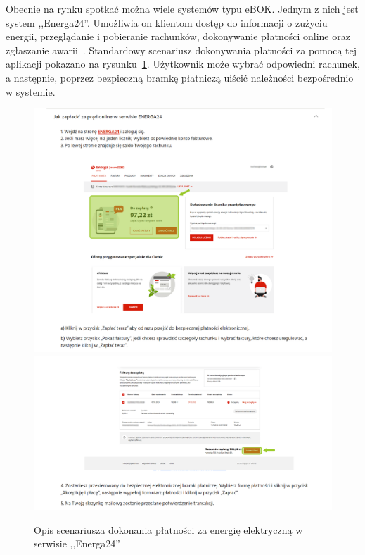 Obecnie na rynku spotkać można wiele systemów typu eBOK. Jednym z nich jest system ,,Energa24''. Umożliwia on klientom dostęp do informacji o zużyciu energii, przeglądanie i pobieranie rachunków, dokonywanie płatności online oraz zgłaszanie awarii~\cite{energa}. Standardowy scenariusz dokonywania płatności za pomocą tej aplikacji pokazano na rysunku~\ref{fig:energa_manual}. Użytkownik może wybrać odpowiedni rachunek, a następnie, poprzez bezpieczną bramkę płatniczą uiścić należności bezpośrednio w systemie.
\begin{figure}[htb]
	\centering
		\includegraphics[width=0.91\linewidth]{rys01/energa_manual_1.png} \\[-1ex]
		\includegraphics[width=0.91\linewidth]{rys01/energa_manual_2.png} \\[-1ex]
		\caption{Opis scenariusza dokonania płatności za energię elektryczną w serwisie ,,Energa24''~\cite{energa}}
	\label{fig:energa_manual}
\end{figure}

